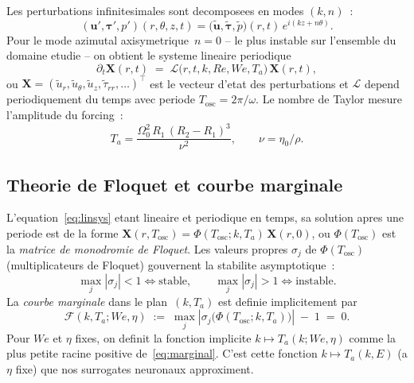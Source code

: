\documentclass[11pt,a4paper]{article}
\newcommand{\We}{\mathit{We}}
\newcommand{\Rey}{\mathit{Re}}
\newcommand{\Ta}{T_a}
\begin{document}
Les perturbations infinitesimales sont decomposees en modes
$(k,n)$~:
\begin{equation}
(\mathbf{u}',\bm\tau',p')(r,\theta,z,t)
= \bigl(\widetilde{\mathbf{u}},\widetilde{\bm\tau},\widetilde p\bigr)(r,t)\,
   e^{i(kz+n\theta)}.
\end{equation}
Pour le mode azimutal axisymetrique~$n\!=\!0$ -- le plus instable
sur l'ensemble du domaine etudie -- on obtient le systeme lineaire
periodique
\begin{equation}
\partial_t \mathbf{X}(r,t)\;=\;\mathcal{L}\bigl(r,t,k,\Rey,\We,\Ta\bigr)\,
\mathbf{X}(r,t),
\label{eq:linsys}
\end{equation}
ou $\mathbf{X}=(\widetilde{u}_r,\widetilde{u}_\theta,\widetilde{u}_z,
\widetilde\tau_{rr},\ldots)^\top$ est le vecteur d'etat des
perturbations et $\mathcal{L}$ depend periodiquement du temps avec
periode $T_\text{osc}=2\pi/\omega$. Le nombre de Taylor mesure
l'amplitude du forcing~:
\begin{equation}
\Ta=\frac{\Omega_0^2\,R_1\,(R_2-R_1)^3}{\nu^2},\qquad \nu=\eta_0/\rho.
\end{equation}

\subsection{Theorie de Floquet et courbe marginale}

L'equation~\eqref{eq:linsys} etant lineaire et periodique en
temps, sa solution apres une periode est de la forme
$\mathbf{X}(r,T_\text{osc})=\Phi(T_\text{osc};k,\Ta)\,\mathbf{X}(r,0)$,
ou $\Phi(T_\text{osc})$ est la \emph{matrice de monodromie de
Floquet}. Les valeurs propres $\sigma_j$ de
$\Phi(T_\text{osc})$ (multiplicateurs de Floquet) gouvernent la
stabilite asymptotique~:
\begin{equation}
\max_j |\sigma_j|<1 \Leftrightarrow \text{stable},\qquad
\max_j |\sigma_j|>1 \Leftrightarrow \text{instable}.
\end{equation}
La \emph{courbe marginale} dans le plan~$(k,\Ta)$ est definie
implicitement par
\begin{equation}
\boxed{\quad
\mathcal{F}(k,\Ta;\We,\eta)\;:=\;
\max_j |\sigma_j\bigl(\Phi(T_\text{osc};k,\Ta)\bigr)|\;-\;1
\;=\;0.\quad}
\label{eq:marginal}
\end{equation}
Pour $\We$ et $\eta$ fixes, on definit la fonction implicite
$k\!\mapsto\!\Ta(k;\We,\eta)$ comme la plus petite racine positive
de~\eqref{eq:marginal}. C'est cette fonction
$k\!\mapsto\!\Ta(k,E)$ (a $\eta$ fixe) que nos surrogates
neuronaux approximent.
\end{document}
